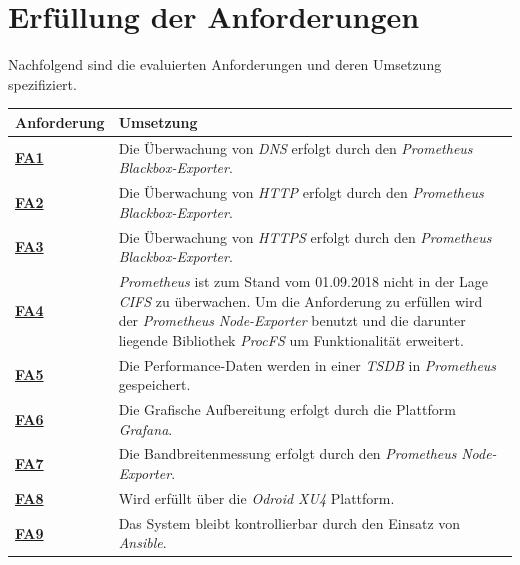 \documentclass[titlepage]{report}
\begin{document}
\section*{Erfüllung der Anforderungen}
Nachfolgend sind die evaluierten Anforderungen und deren Umsetzung
spezifiziert.
\tabulinesep=1.2mm
\begin{center}
    \begin{tabu}{X[-1] X}
\toprule
\textbf{Anforderung} & \textbf{Umsetzung}  \\
\midrule
        \hyperref[table:FA1]{\textbf{FA1}} & Die Überwachung von \emph{DNS} erfolgt durch den \emph{Prometheus} \emph{Blackbox-Exporter}. \\
        \hyperref[table:FA2]{\textbf{FA2}} & Die Überwachung von \emph{HTTP} erfolgt durch den \emph{Prometheus} \emph{Blackbox-Exporter}. \\
        \hyperref[table:FA3]{\textbf{FA3}} & Die Überwachung von \emph{HTTPS} erfolgt durch den \emph{Prometheus} \emph{Blackbox-Exporter}. \\
        \hyperref[table:FA4]{\textbf{FA4}} & \emph{Prometheus} ist zum Stand vom 01.09.2018 nicht in der Lage \emph{CIFS} zu überwachen. Um die Anforderung zu erfüllen wird der \emph{Prometheus} \emph{Node-Exporter} benutzt und die darunter liegende Bibliothek \emph{ProcFS} um Funktionalität erweitert. \\
        \hyperref[table:FA5]{\textbf{FA5}} & Die Performance-Daten werden in einer \emph{TSDB} in \emph{Prometheus} gespeichert. \\
        \hyperref[table:FA6]{\textbf{FA6}} & Die Grafische Aufbereitung erfolgt durch die Plattform \emph{Grafana}. \\
        \hyperref[table:FA7]{\textbf{FA7}} & Die Bandbreitenmessung erfolgt durch den \emph{Prometheus} \emph{Node-Exporter}. \\
        \hyperref[table:FA8]{\textbf{FA8}} & Wird erfüllt über die \emph{Odroid XU4} Plattform. \\
        \hyperref[table:FA9]{\textbf{FA9}} & Das System bleibt kontrollierbar durch den Einsatz von \emph{Ansible}. \\
\bottomrule
    \end{tabu}
    \label{table:mapping1}
\end{center}
\tabulinesep=1.2mm
\end{document}
